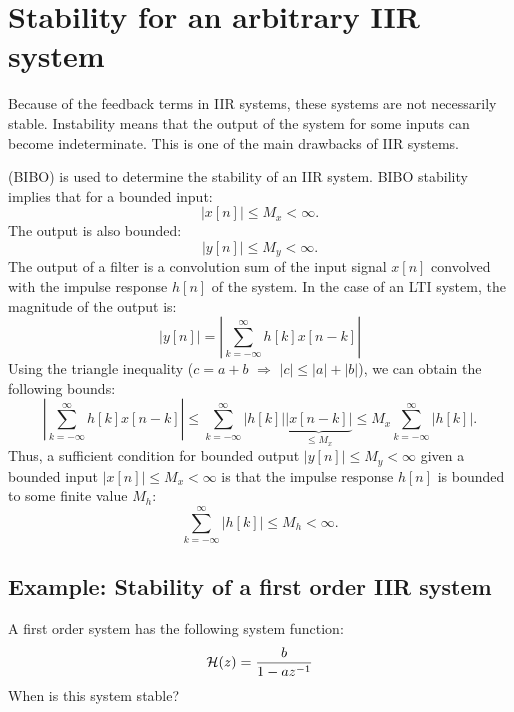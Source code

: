 \section{Stability for an arbitrary IIR system}
Because of the feedback terms in IIR systems, these systems are not
necessarily stable. Instability means that the output of the system
for some inputs can become indeterminate. This is one of the main
drawbacks of IIR systems.

 (BIBO) 
is used to determine the stability of an IIR system. BIBO stability implies that for a bounded
input:
\begin{equation}
    |x[n]| \le M_x < \infty.
\end{equation}
The output is also bounded:
\begin{equation}
    |y[n]| \le M_y < \infty.
\end{equation}
The output of a filter is a convolution sum of the input signal $x[n]$
convolved with the impulse response $h[n]$ of the system. In the case
of an LTI system, the magnitude of the output is:
\begin{equation}
    |y[n]| = \left| \sum_{k=-\infty}^{\infty} h[k] x[n-k]\right|
\end{equation}
Using the triangle inequality ($c = a+b$ $\Rightarrow$ $|c|\le |a|+|b|$), we can obtain the following bounds:
\begin{equation}
    \left|\sum_{k=-\infty}^{\infty} h[k]x[n-k]\right| \le \sum_{k=-\infty}^{\infty}|h[k]|\underbrace{|x[n-k]|}_{\le M_x} \le M_x \sum_{k=-\infty}^{\infty}|h[k]|.
\end{equation}
Thus, a sufficient condition for bounded output $|y[n]| \le M_y < \infty$ given a bounded input
$|x[n]|\le M_x < \infty$ is that the impulse response $h[n]$ is bounded to some finite value $M_h$:
\begin{equation}
    \boxed{
    \sum_{k=-\infty}^{\infty} |h[k]| \le M_h < \infty.
    }
\end{equation}

\subsection{Example: Stability of a first order IIR system}

A first order system has the following system function:
\begin{equation}
    \mathcal{H}(z) = \frac{b}{1-a z^{-1}}
\end{equation}
When is this system stable?


